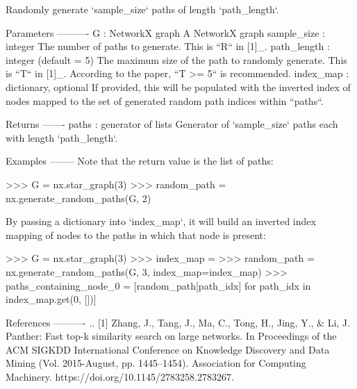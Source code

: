 \begin{DoxyVerb}Randomly generate `sample_size` paths of length `path_length`.

Parameters
----------
G : NetworkX graph
    A NetworkX graph
sample_size : integer
    The number of paths to generate. This is ``R`` in [1]_.
path_length : integer (default = 5)
    The maximum size of the path to randomly generate.
    This is ``T`` in [1]_. According to the paper, ``T >= 5`` is
    recommended.
index_map : dictionary, optional
    If provided, this will be populated with the inverted
    index of nodes mapped to the set of generated random path
    indices within ``paths``.

Returns
-------
paths : generator of lists
    Generator of `sample_size` paths each with length `path_length`.

Examples
--------
Note that the return value is the list of paths:

>>> G = nx.star_graph(3)
>>> random_path = nx.generate_random_paths(G, 2)

By passing a dictionary into `index_map`, it will build an
inverted index mapping of nodes to the paths in which that node is present:

>>> G = nx.star_graph(3)
>>> index_map = {}
>>> random_path = nx.generate_random_paths(G, 3, index_map=index_map)
>>> paths_containing_node_0 = [random_path[path_idx] for path_idx in index_map.get(0, [])]

References
----------
.. [1] Zhang, J., Tang, J., Ma, C., Tong, H., Jing, Y., & Li, J.
       Panther: Fast top-k similarity search on large networks.
       In Proceedings of the ACM SIGKDD International Conference
       on Knowledge Discovery and Data Mining (Vol. 2015-August, pp. 1445–1454).
       Association for Computing Machinery. https://doi.org/10.1145/2783258.2783267.
\end{DoxyVerb}
 \mbox{\label{namespacenetworkx_1_1algorithms_1_1similarity_a884d76faa68663c18288eb5f32eaea7b}} 
